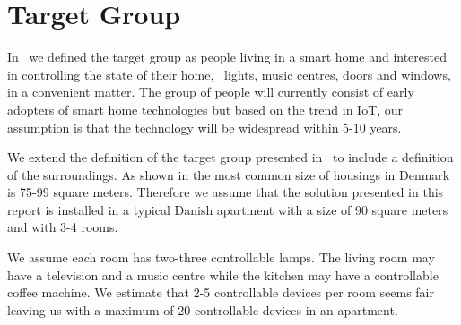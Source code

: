 \section{Target Group}
\label{sec:target-group}

In~\cite[p. 15]{prespecialisation} we defined the target group as people living in a smart home and interested in controlling the state of their home, \eg~lights, music centres, doors and windows, in a convenient matter. The group of people will currently consist of early adopters of smart home technologies but based on the trend in IoT, our assumption is that the technology will be widespread within 5-10 years. 

We extend the definition of the target group presented in~\cite[p. 15]{prespecialisation} to include a definition of the surroundings. As shown in  the most common size of housings in Denmark is 75-99 square meters. Therefore we assume that the solution presented in this report is installed in a typical Danish apartment with a size of 90 square meters and with 3-4 rooms.

We assume each room has two-three controllable lamps. The living room may have a television and a music centre while the kitchen may have a controllable coffee machine. We estimate that 2-5 controllable devices per room seems fair leaving us with a maximum of 20 controllable devices in an apartment.


